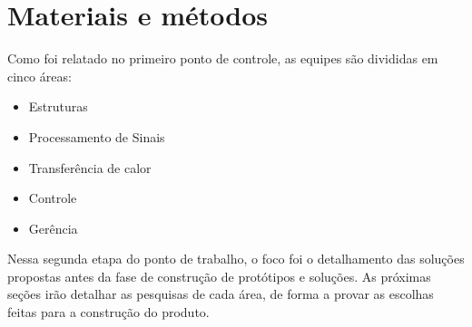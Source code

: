 \chapter{Materiais e métodos}

Como foi relatado no primeiro ponto de controle, as equipes são divididas em cinco áreas:
\begin{itemize}
\item Estruturas
\item Processamento de Sinais
\item Transferência de calor
\item Controle
\item Gerência
\end{itemize}

Nessa segunda etapa do ponto de trabalho, o foco foi o detalhamento das soluções propostas antes da fase de construção de protótipos e soluções. As próximas seções irão detalhar as pesquisas de cada área, de forma a provar as escolhas feitas para a construção do produto.
